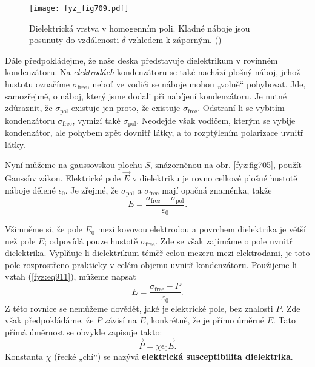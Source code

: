     \begin{figure}[ht!] %
      \centering
      \texttt{[image: fyz\_fig709.pdf]}
      \caption{Dielektrická vrstva v homogenním poli. Kladné náboje jsou posunuty do vzdálenosti
              \(δ\) vzhledem k záporným. (\cite[s.~177]{Feynman02})}
      \label{fyz:fig709}
    \end{figure}
    
    Dále předpokládejme, že naše deska představuje dielektrikum v rovinném kondenzátoru. Na
    \emph{elektrodách} kondenzátoru se také nachází plošný náboj, jehož hustotu označíme
    \(σ_{\text{free}}\), neboť ve vodiči se náboje mohou „volně“ pohybovat. Jde, samozřejmě, o
    náboj, který jsme dodali při nabíjení kondenzátoru. Je nutné zdůraznit, že \(σ_{\text{pol}}\)
    existuje jen proto, že existuje \(σ_{\text{free}}\). Odstraní-li se vybitím kondenzátoru
    \(σ_{\text{free}}\), vymizí také \(σ_{\text{pol}}\). Neodejde však vodičem, kterým se vybije
    kondenzátor, ale pohybem zpět dovnitř látky, a to rozptýlením polarizace uvnitř látky.

    Nyní můžeme na gaussovskou plochu \(S\), znázorněnou na obr. \ref{fyz:fig705}, použít Gaussův
    zákon. Elektrické pole \(\vec{E}\) v dielektriku je rovno celkové plošné hustotě náboje dělené
    \(ϵ_0\). Je zřejmé, že \(σ_{\text{pol}}\) a \(σ_{\text{free}}\) mají opačná znaménka, takže
    \begin{equation}\label{fyz:eq912}
      E = \dfrac{σ_{\text{free}} - σ_{\text{pol}}}{\varepsilon_0}.
    \end{equation}

    Všimněme si, že pole \(E_0\) mezi kovovou elektrodou a povrchem dielektrika je větší než pole
    \(E\); odpovídá pouze hustotě \(σ_{\text{free}}\). Zde se však zajímáme o pole uvnitř
    dielektrika. Vyplňuje-li dielektrikum téměř celou mezeru mezi elektrodami, je toto pole
    rozprostřeno prakticky v celém objemu uvnitř kondenzátoru. Použijeme-li vztah (\ref{fyz:eq911}),
    můžeme napsat
    \begin{equation}\label{fyz:eq913}
      E = \dfrac{σ_{\text{free}} - P}{\varepsilon_0}.
    \end{equation}
    Z této rovnice se nemůžeme dovědět, jaké je elektrické pole, bez znalosti \(P\). Zde však
    předpokládáme, že \(P\) závisí na \(E\), konkrétně, že je přímo úměrné \(E\). Tato přímá
    úměrnost se obvykle zapisuje takto:
    \begin{equation}\label{fyz:eq914}
      \vec{P}=χϵ_0\vec{E}.
    \end{equation}
    Konstanta \(χ\) (řecké „chí“) se nazývá \textbf{elektrická susceptibilita dielektrika}.

